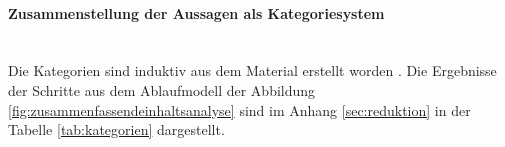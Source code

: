 %	
%	
%	
%	
%	
%	
\paragraph{Zusammenstellung der Aussagen als Kategoriesystem}\mbox{} \\
Die Kategorien sind induktiv aus dem Material erstellt worden \cite{mayring2012qualitative}. Die Ergebnisse der Schritte aus dem Ablaufmodell der Abbildung \ref{fig:zusammenfassendeinhaltsanalyse} sind im Anhang \ref{sec:reduktion} in der Tabelle \ref{tab:kategorien} dargestellt. \\

\\


